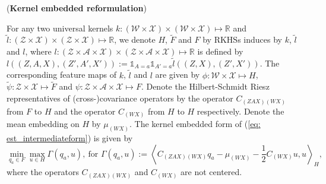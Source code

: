 \begin{lemma}(\textbf{Kernel embedded reformulation})
    
    For any two universal kernels $k: (\mathcal{W}\times\mathcal{X})\times(\mathcal{W}\times\mathcal{X})\mapsto\mathbb{R}$ 
    and $\tilde{l}: (\mathcal{Z}\times\mathcal{X})\times(\mathcal{Z}\times\mathcal{X})\mapsto\mathbb{R}$, 
    we denote $H$, $\tilde{F}$ and $F$ by RKHSs induces by $k$, $\tilde{l}$ and $l$, 
    where $l: (\mathcal{Z}\times\mathcal{A}\times\mathcal{X})\times(\mathcal{Z}\times\mathcal{A}\times\mathcal{X})\mapsto\mathbb{R}$ is defined by $l((Z,A,X),(Z',A',X')):=\mathds{1}_{A=a}\mathds{1}_{A'=a}\tilde{l}((Z,X),(Z',X'))$. 
    The corresponding feature maps of $k$, $\tilde{l}$ and $l$ are given by $\phi:\mathcal{W}\times\mathcal{X}\mapsto H$,  
    $\tilde{\psi}: \mathcal{Z}\times\mathcal{X}\mapsto \tilde{F}$ and $\psi:\mathcal{Z}\times\mathcal{A}\times\mathcal{X}\mapsto F$. 
    Denote the Hilbert-Schmidt Riesz representatives of (cross-)covariance operators by the operator $C_{(ZAX)(WX)}$ from $F$ to $H$ and the operator $C_{(WX)}$ from $H$ to $H$ respectively. 
    Denote the mean embedding on $H$ by $\mu_{(WX)}$.
    The kernel embedded form of (\ref{eq: est_intermediateform}) is given by 
    \begin{equation}
        \label{eq: est_kernelembedform}
        \min_{q_a\in F}\max_{u\in H}\Gamma(q_a,u),\ \text{for }\Gamma(q_a,u):= \left\langle C_{(ZAX)(WX)}q_a-\mu_{(WX)}-\frac{1}{2}C_{(WX)}u,u\right\rangle _{H},   
    \end{equation}
    where the operators $C_{(ZAX)(WX)}$ and $C_{(WX)}$ are not centered.
\end{lemma}
